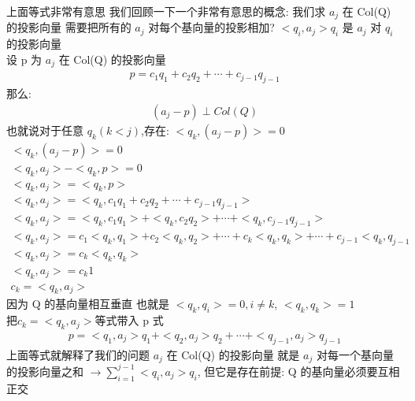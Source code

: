 \documentclass[12pt]{article}
\begin{document}
\begin{flushleft}
    上面等式非常有意思 我们回顾一下一个非常有意思的概念: 我们求 $a_{j}$ 在 Col(Q) 的投影向量
    需要把所有的 $a_{j}$ 对每个基向量的投影相加? $<q_{i},a_{j}>q_{i}$ 是 $a_{j}$ 对 $q_{i}$的投影向量 \\
    设 p 为 $a_{j}$ 在 Col(Q) 的投影向量 \\
    \begin{align}
        p = c_{1}q_{1} + c_{2}q_{2} + \cdots + c_{j - 1}q_{j - 1}
    \end{align}
    那么:\\
    \begin{align}
        (a_{j} - p) \perp  Col(Q)
    \end{align}
    也就说对于任意 $q_{k} (k < j)$,存在: $<q_{k}, (a_{j} - p)> = 0$
    \begin{align}
        <q_{k},(a_{j} - p)> = 0                                                                                                     \\
        <q_{k},a_{j}> - <q_{k},p> = 0                                                                                               \\
        <q_{k},a_{j}> = <q_{k}, p>                                                                                                  \\
        <q_{k},a_{j}> = <q_{k}, c_{1}q_{1} + c_{2}q_{2} + \cdots + c_{j - 1}q_{j - 1} >                                             \\
        <q_{k},a_{j}> = <q_{k}, c_{1}q_{1}> + <q_{k}, c_{2}q_{2}> + \cdots + <q_{k}, c_{j - 1}q_{j - 1}>                            \\
        <q_{k},a_{j}> = c_{1}<q_{k},q_{1}> + c_{2}<q_{k},q_{2}> + \cdots + c_{k}<q_{k},q_{k}> +  \cdots + c_{j - 1}<q_{k},q_{j - 1} \\
        <q_{k},a_{j}> =  c_{k}<q_{k},q_{k}>                                                                                         \\
        <q_{k},a_{j}> = c_{k}1                                                                                                      \\
        c_{k} = <q_{k},a_{j}>
    \end{align}
    因为 Q 的基向量相互垂直 也就是 $<q_{k},q_{i}> = 0, i \neq k $, $<q_{k},q_{k}>  = 1 $ \\
    把$c_{k} = <q_{k},a_{j}>$等式带入 p 式
    \begin{align}
        p = <q_{1},a_{j}>q_{1} +  <q_{2},a_{j}>q_{2} + \cdots  +  <q_{j - 1},a_{j}>q_{j - 1}
    \end{align}
    上面等式就解释了我们的问题 $a_{j}$ 在 Col(Q) 的投影向量 就是 $a_{j}$ 对每一个基向量的投影向量之和 $\to \sum_{i = 1}^{j - 1}<q_{i},a_{j}>q_{i}$, 但它是存在前提: Q 的基向量必须要互相正交


\end{flushleft}
\end{document}
